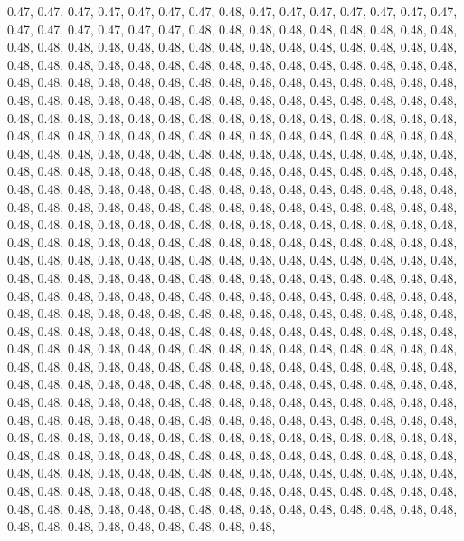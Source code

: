 \documentclass[11pt,]{article}
\begin{document}
0.47, 0.47, 0.47, 0.47, 0.47, 0.47, 0.47, 0.48, 0.47, 0.47, 0.47, 0.47,
0.47, 0.47, 0.47, 0.47, 0.47, 0.47, 0.47, 0.47, 0.47, 0.48, 0.48, 0.48,
0.48, 0.48, 0.48, 0.48, 0.48, 0.48, 0.48, 0.48, 0.48, 0.48, 0.48, 0.48,
0.48, 0.48, 0.48, 0.48, 0.48, 0.48, 0.48, 0.48, 0.48, 0.48, 0.48, 0.48,
0.48, 0.48, 0.48, 0.48, 0.48, 0.48, 0.48, 0.48, 0.48, 0.48, 0.48, 0.48,
0.48, 0.48, 0.48, 0.48, 0.48, 0.48, 0.48, 0.48, 0.48, 0.48, 0.48, 0.48,
0.48, 0.48, 0.48, 0.48, 0.48, 0.48, 0.48, 0.48, 0.48, 0.48, 0.48, 0.48,
0.48, 0.48, 0.48, 0.48, 0.48, 0.48, 0.48, 0.48, 0.48, 0.48, 0.48, 0.48,
0.48, 0.48, 0.48, 0.48, 0.48, 0.48, 0.48, 0.48, 0.48, 0.48, 0.48, 0.48,
0.48, 0.48, 0.48, 0.48, 0.48, 0.48, 0.48, 0.48, 0.48, 0.48, 0.48, 0.48,
0.48, 0.48, 0.48, 0.48, 0.48, 0.48, 0.48, 0.48, 0.48, 0.48, 0.48, 0.48,
0.48, 0.48, 0.48, 0.48, 0.48, 0.48, 0.48, 0.48, 0.48, 0.48, 0.48, 0.48,
0.48, 0.48, 0.48, 0.48, 0.48, 0.48, 0.48, 0.48, 0.48, 0.48, 0.48, 0.48,
0.48, 0.48, 0.48, 0.48, 0.48, 0.48, 0.48, 0.48, 0.48, 0.48, 0.48, 0.48,
0.48, 0.48, 0.48, 0.48, 0.48, 0.48, 0.48, 0.48, 0.48, 0.48, 0.48, 0.48,
0.48, 0.48, 0.48, 0.48, 0.48, 0.48, 0.48, 0.48, 0.48, 0.48, 0.48, 0.48,
0.48, 0.48, 0.48, 0.48, 0.48, 0.48, 0.48, 0.48, 0.48, 0.48, 0.48, 0.48,
0.48, 0.48, 0.48, 0.48, 0.48, 0.48, 0.48, 0.48, 0.48, 0.48, 0.48, 0.48,
0.48, 0.48, 0.48, 0.48, 0.48, 0.48, 0.48, 0.48, 0.48, 0.48, 0.48, 0.48,
0.48, 0.48, 0.48, 0.48, 0.48, 0.48, 0.48, 0.48, 0.48, 0.48, 0.48, 0.48,
0.48, 0.48, 0.48, 0.48, 0.48, 0.48, 0.48, 0.48, 0.48, 0.48, 0.48, 0.48,
0.48, 0.48, 0.48, 0.48, 0.48, 0.48, 0.48, 0.48, 0.48, 0.48, 0.48, 0.48,
0.48, 0.48, 0.48, 0.48, 0.48, 0.48, 0.48, 0.48, 0.48, 0.48, 0.48, 0.48,
0.48, 0.48, 0.48, 0.48, 0.48, 0.48, 0.48, 0.48, 0.48, 0.48, 0.48, 0.48,
0.48, 0.48, 0.48, 0.48, 0.48, 0.48, 0.48, 0.48, 0.48, 0.48, 0.48, 0.48,
0.48, 0.48, 0.48, 0.48, 0.48, 0.48, 0.48, 0.48, 0.48, 0.48, 0.48, 0.48,
0.48, 0.48, 0.48, 0.48, 0.48, 0.48, 0.48, 0.48, 0.48, 0.48, 0.48, 0.48,
0.48, 0.48, 0.48, 0.48, 0.48, 0.48, 0.48, 0.48, 0.48, 0.48, 0.48, 0.48,
0.48, 0.48, 0.48, 0.48, 0.48, 0.48, 0.48, 0.48, 0.48, 0.48, 0.48, 0.48,
0.48, 0.48, 0.48, 0.48, 0.48, 0.48, 0.48, 0.48, 0.48, 0.48, 0.48, 0.48,
0.48, 0.48, 0.48, 0.48, 0.48, 0.48, 0.48, 0.48, 0.48, 0.48, 0.48, 0.48,
0.48, 0.48, 0.48, 0.48, 0.48, 0.48, 0.48, 0.48, 0.48, 0.48, 0.48, 0.48,
0.48, 0.48, 0.48, 0.48, 0.48, 0.48, 0.48, 0.48, 0.48, 0.48, 0.48, 0.48,
0.48, 0.48, 0.48, 0.48, 0.48, 0.48, 0.48, 0.48, 0.48, 0.48, 0.48, 0.48,
0.48, 0.48, 0.48, 0.48, 0.48, 0.48, 0.48, 0.48, 0.48, 0.48, 0.48, 0.48,
0.48, 0.48, 0.48, 0.48, 0.48, 0.48, 0.48, 0.48, 0.48, 0.48, 0.48, 0.48,
0.48, 0.48, 0.48, 0.48, 0.48, 0.48, 0.48, 0.48, 0.48, 0.48, 0.48, 0.48,
\end{document}
